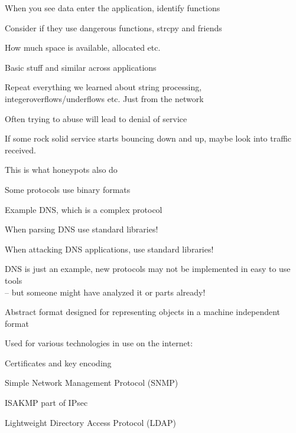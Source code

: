\documentclass[Screen16to9,17pt]{foils}
\begin{document}

\begin{list2}
\item When you see data enter the application, identify functions
\item Consider if they use dangerous functions, strcpy and friends
\item How much space is available, allocated etc.
\item Basic stuff and similar across applications
\vskip 2cm
\item Repeat everything we learned about string processing, integeroverflows/underflows etc. Just from the network
\item Often trying to abuse will lead to denial of service
\vskip 1cm
\item If some rock solid service starts bouncing down and up, maybe look into traffic received.
\item This is what honeypots also do
\end{list2}


\begin{list2}
\item Some protocols use binary formats
\item Example DNS, which is a complex protocol
\item When parsing DNS use standard libraries!
\item When attacking DNS applications, use standard libraries! \smiley
\item DNS is just an example, new protocols may not be implemented in easy to use tools\\ -- but someone might have analyzed it or parts already!
\end{list2}


\begin{list2}
\item Abstract format designed for representing objects in a machine independent format
\item Used for various technologies in use on the internet:
\item Certificates and key encoding
\item Simple Network Management Protocol (SNMP)
\item ISAKMP part of IPsec
\item Lightweight Directory Access Protocol (LDAP)
\end{list2}
\end{document}

